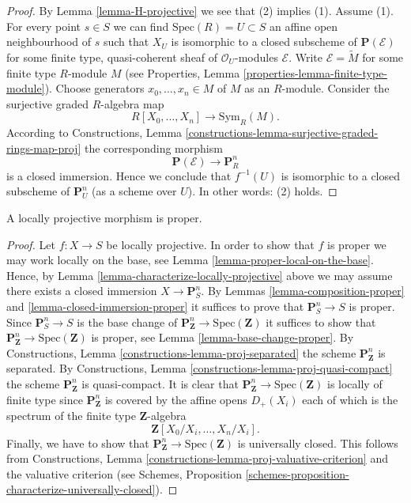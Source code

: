 \begin{proof}
By Lemma \ref{lemma-H-projective} we see that (2) implies (1). Assume (1).
For every point $s \in S$ we can find $\text{Spec}(R) = U \subset S$
an affine open neighbourhood of $s$ such that $X_U$ is isomorphic to a
closed subscheme of $\mathbf{P}(\mathcal{E})$ for some finite type,
quasi-coherent sheaf of $\mathcal{O}_U$-modules $\mathcal{E}$.
Write $\mathcal{E} = \widetilde{M}$ for some finite type
$R$-module $M$ (see
Properties, Lemma \ref{properties-lemma-finite-type-module}).
Choose generators $x_0, \ldots, x_n \in M$ of $M$ as an $R$-module.
Consider the surjective graded $R$-algebra map
$$
R[X_0, \ldots, X_n] \longrightarrow \text{Sym}_R(M).
$$
According to
Constructions, Lemma \ref{constructions-lemma-surjective-graded-rings-map-proj}
the corresponding morphism
$$
\mathbf{P}(\mathcal{E}) \to \mathbf{P}^n_R
$$
is a closed immersion. Hence we conclude that $f^{-1}(U)$ is isomorphic
to a closed subscheme of $\mathbf{P}^n_U$ (as a scheme over $U$).
In other words: (2) holds.
\end{proof}

\begin{lemma}
\label{lemma-locally-projective-proper}
A locally projective morphism is proper.
\end{lemma}

\begin{proof}
Let $f : X \to S$ be locally projective.
In order to show that $f$ is proper we may work locally on the
base, see Lemma \ref{lemma-proper-local-on-the-base}.
Hence, by Lemma \ref{lemma-characterize-locally-projective}
above we may assume there exists a closed immersion $X \to \mathbf{P}^n_S$.
By Lemmas \ref{lemma-composition-proper}
and \ref{lemma-closed-immersion-proper} it suffices to prove that
$\mathbf{P}^n_S \to S$ is proper. Since
$\mathbf{P}^n_S \to S$ is the base change of
$\mathbf{P}^n_{\mathbf{Z}} \to \text{Spec}(\mathbf{Z})$ it suffices
to show that $\mathbf{P}^n_{\mathbf{Z}} \to \text{Spec}(\mathbf{Z})$
is proper, see Lemma \ref{lemma-base-change-proper}.
By Constructions, Lemma \ref{constructions-lemma-proj-separated} the scheme
$\mathbf{P}^n_{\mathbf{Z}}$ is separated.
By Constructions, Lemma \ref{constructions-lemma-proj-quasi-compact} the scheme
$\mathbf{P}^n_{\mathbf{Z}}$ is quasi-compact.
It is clear that $\mathbf{P}^n_{\mathbf{Z}} \to \text{Spec}(\mathbf{Z})$
is locally of finite type since $\mathbf{P}^n_{\mathbf{Z}}$ is
covered by the affine opens $D_{+}(X_i)$ each of which is the
spectrum of the finite type $\mathbf{Z}$-algebra
$$
\mathbf{Z}[X_0/X_i, \ldots, X_n/X_i].
$$
Finally, we have to show that
$\mathbf{P}^n_{\mathbf{Z}} \to \text{Spec}(\mathbf{Z})$
is universally closed. This follows from
Constructions, Lemma \ref{constructions-lemma-proj-valuative-criterion}
and the valuative criterion (see Schemes,
Proposition \ref{schemes-proposition-characterize-universally-closed}).
\end{proof}

